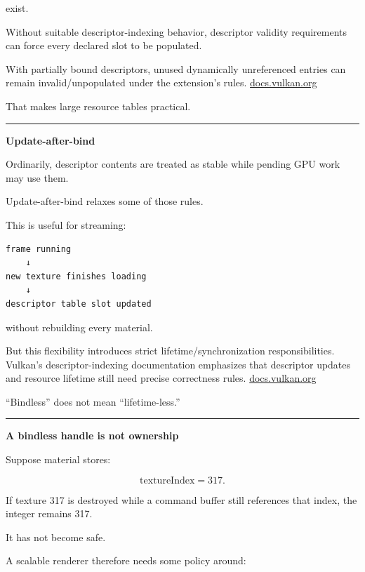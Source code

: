 exist.

Without suitable descriptor-indexing behavior, descriptor validity requirements can force every declared slot to be populated.

With partially bound descriptors, unused dynamically unreferenced entries can remain invalid/unpopulated under the extension's rules. \href{https://docs.vulkan.org/spec/latest/chapters/descriptorsets.html?utm_source=chatgpt.com}{docs.vulkan.org}

That makes large resource tables practical.

\begin{center}\rule{0.5\linewidth}{0.5pt}\end{center}

\textbf{Update-after-bind}

Ordinarily, descriptor contents are treated as stable while pending GPU work may use them.

Update-after-bind relaxes some of those rules.

This is useful for streaming:

\begin{verbatim}
frame running
    ↓
new texture finishes loading
    ↓
descriptor table slot updated
\end{verbatim}

without rebuilding every material.

But this flexibility introduces strict lifetime/synchronization responsibilities. Vulkan's descriptor-indexing documentation emphasizes that descriptor updates and resource lifetime still need precise correctness rules. \href{https://docs.vulkan.org/tutorial/latest/Building_a_Simple_Engine/Advanced_Topics/Descriptor_Indexing_UpdateAfterBind.html?utm_source=chatgpt.com}{docs.vulkan.org}

``Bindless'' does not mean ``lifetime-less.''

\begin{center}\rule{0.5\linewidth}{0.5pt}\end{center}

\textbf{A bindless handle is not ownership}

Suppose material stores:

\[
\text{textureIndex}=317.
\]

If texture 317 is destroyed while a command buffer still references that index, the integer remains 317.

It has not become safe.

A scalable renderer therefore needs some policy around:

